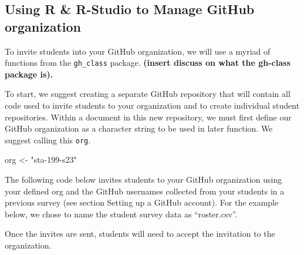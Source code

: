 \documentclass[
  12pt]{article}
\newenvironment{Shaded}{\begin{snugshade}}{\end{snugshade}}
\newcommand{\AttributeTok}[1]{\textcolor[rgb]{0.40,0.45,0.13}{#1}}
\newcommand{\CommentTok}[1]{\textcolor[rgb]{0.37,0.37,0.37}{#1}}
\newcommand{\FunctionTok}[1]{\textcolor[rgb]{0.28,0.35,0.67}{#1}}
\newcommand{\NormalTok}[1]{\textcolor[rgb]{0.00,0.23,0.31}{#1}}
\newcommand{\OtherTok}[1]{\textcolor[rgb]{0.00,0.23,0.31}{#1}}
\newcommand{\SpecialCharTok}[1]{\textcolor[rgb]{0.37,0.37,0.37}{#1}}
\newcommand{\StringTok}[1]{\textcolor[rgb]{0.13,0.47,0.30}{#1}}
\begin{document}
\hypertarget{using-r-r-studio-to-manage-github-organization}{%
\subsection{Using R \& R-Studio to Manage GitHub
organization}\label{using-r-r-studio-to-manage-github-organization}}

To invite students into your GitHub organization, we will use a myriad
of functions from the \texttt{gh\_class} package. \textbf{(insert
discuss on what the gh-class package is).}

To start, we suggest creating a separate GitHub repository that will
contain all code used to invite students to your organization and to
create individual student repositories. Within a document in this new
repository, we must first define our GitHub organization as a character
string to be used in later function. We suggest calling this
\texttt{org}.

\begin{Shaded}
\begin{Highlighting}[]
\NormalTok{org }\OtherTok{\textless{}{-}} \StringTok{"sta{-}199{-}s23"}
\end{Highlighting}
\end{Shaded}

The following code below invites students to your GitHub organization
using your defined org and the GitHub usernames collected from your
students in a previous survey (see section Setting up a GitHub account).
For the example below, we chose to name the student survey data as
``roster.csv''.

\begin{Shaded}
\end{Shaded}

Once the invites are sent, students will need to accept the invitation
to the organization.
\end{document}
